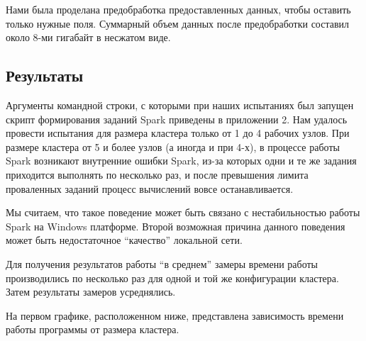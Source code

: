 \documentclass[12pt,a4paper]{report}
\begin{document}
Нами была проделана предобработка предоставленных данных, чтобы оставить только нужные поля. Суммарный объем данных после предобработки составил около 8-ми гигабайт в несжатом виде.

\subsection{Результаты}
Аргументы командной строки, с которыми при наших испытаниях был запущен скрипт формирования заданий Spark приведены в приложении 2. Нам удалось провести испытания для размера кластера только от 1 до 4 рабочих узлов. При размере кластера от 5 и более узлов (а иногда и при 4-х), в процессе работы Spark возникают внутренние ошибки Spark, из-за которых одни и те же задания приходится выполнять по несколько раз, и после превышения лимита проваленных заданий процесс вычислений вовсе останавливается.

Мы считаем, что такое поведение может быть связано с нестабильностью работы Spark на Windows платформе. Второй возможная причина данного поведения может быть недостаточное ``качество'' локальной сети.

Для получения результатов работы ``в среднем'' замеры времени работы производились по несколько раз для одной и той же конфигурации кластера. Затем результаты замеров усреднялись.

На первом графике, расположенном ниже, представлена зависимость времени работы программы от размера кластера.


\begin{figure}[H]
\centering
\end{figure}
\end{document}
